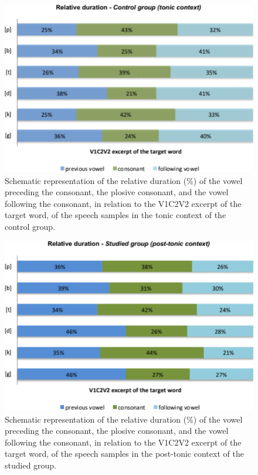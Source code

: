 \begin{figure}
\centering
\includegraphics[width=0.9\linewidth]{imgs/gregio-image6.png}
\caption{Schematic representation of the relative duration (\%) of the vowel preceding the consonant, the plosive consonant, and the vowel following the consonant, in relation to the V1C2V2 excerpt of the target word, of the speech samples in the tonic context of the control group.} 
\label{gregio-fig06}
\end{figure}

\begin{figure}
\centering
\includegraphics[width=0.9\linewidth]{imgs/gregio-image7.png}
\caption{Schematic representation of the relative duration (\%) of the vowel preceding the consonant, the plosive consonant, and the vowel following the consonant, in relation to the V1C2V2 excerpt of the target word, of the speech samples in the post-tonic context of the studied group.} 
\label{gregio-fig07}
\end{figure}

